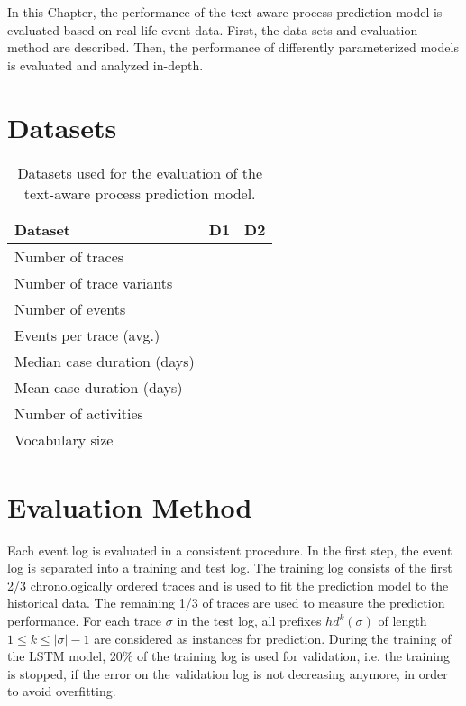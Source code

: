 In this Chapter, the performance of the text-aware process prediction model is evaluated based on real-life event data.
First, the data sets and evaluation method are described. Then, the performance of differently parameterized models is evaluated and analyzed in-depth.


\section{Datasets}

\begin{table}[!htbp]
	\begin{tabularx}{\textwidth}{l l l }
		\toprule
		\textbf{Dataset} & \textbf{D1} & \textbf{D2}  \\
		\midrule
		Number of traces & & \\
		Number of trace variants & & \\
		Number of events & & \\
		Events per trace (avg.) & & \\
		Median case duration (days) & & \\
		Mean case duration (days)& & \\
		Number of activities & & \\
		Vocabulary size & & \\
		\bottomrule
	\end{tabularx}
	\caption[Evaluated datasets]{Datasets used for the evaluation of the text-aware process prediction model.}
	\label{tab:packages}
\end{table}

\section{Evaluation Method}

Each event log is evaluated in a consistent procedure.
In the first step, the event log is separated into a training and test log. 
The training log consists of the first 2/3 chronologically ordered traces and is used to fit the prediction model to the historical data.
The remaining 1/3 of traces are used to measure the prediction performance.
For each trace $\sigma$ in the test log, all prefixes $hd^k(\sigma)$ of length $1 \leq k \leq |\sigma| - 1$ are considered as instances for prediction.
During the training of the LSTM model, 20\% of the training log is used for validation, i.e. the training is stopped, if the error on the validation log is not decreasing anymore, in order to avoid overfitting.

